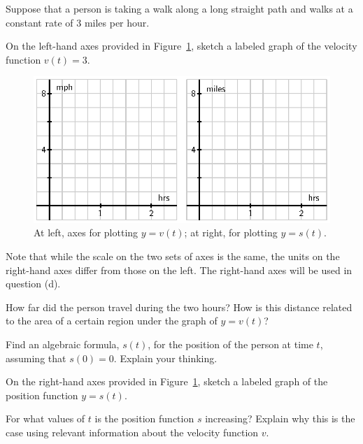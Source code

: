 \begin{pa} \label{PA:4.1}
Suppose that a person is taking a walk along a long straight path and walks at a constant rate of 3 miles per hour.
\ba
	\item On the left-hand axes provided in Figure~\ref{F:4.1.PA1}, sketch a labeled graph of the velocity function $v(t) = 3$.  
\begin{figure}[h]
\begin{center}
\includegraphics{figures/4_1_PA1.eps}
\caption{At left, axes for plotting $y = v(t)$; at right, for plotting $y = s(t)$.} \label{F:4.1.PA1}
\end{center}
\end{figure}
Note that while the scale on the two sets of axes is the same, the units on the right-hand axes differ from those on the left.  The right-hand axes will be used in question (d).
	\item How far did the person travel during the two hours?  How is this distance related to the area of a certain region under the graph of $y = v(t)$?
	\item Find an algebraic formula, $s(t)$, for the position of the person at time $t$, assuming that $s(0) = 0$.  Explain your thinking.
	\item On the right-hand axes provided in Figure~\ref{F:4.1.PA1}, sketch a labeled graph of the position function $y = s(t)$.
	\item For what values of $t$ is the position function $s$ increasing?  Explain why this is the case using relevant information about the velocity function $v$.
\ea
\end{pa} 
\afterpa